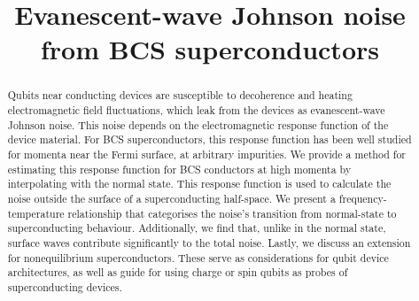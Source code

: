 \documentclass{article}
\begin{document}
\title{Evanescent-wave Johnson noise from BCS superconductors}


\begin{abstract}
Qubits near conducting devices are susceptible to decoherence and heating electromagnetic field fluctuations, which leak from the devices as evanescent-wave Johnson noise.
This noise depends on the electromagnetic response function of the device material.
For BCS superconductors, this response function has been well studied for momenta near the Fermi surface, at arbitrary impurities.
We provide a method for estimating this response function for BCS conductors at high momenta by interpolating with the normal state.
This response function is used to calculate the noise outside the surface of a superconducting half-space.
We present a frequency-temperature relationship that categorises the noise's transition from normal-state to superconducting behaviour. 
Additionally, we find that, unlike in the normal state, surface waves contribute significantly to the total noise.
Lastly, we discuss an extension for nonequilibrium superconductors.
These serve as considerations for qubit device architectures, as well as guide for using charge or spin qubits as probes of superconducting devices.
\end{abstract}
\end{document}
